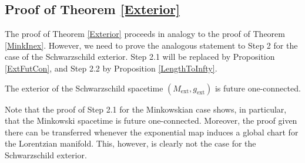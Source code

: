 \documentclass[reqno]{article}
\newcommand{\Mext}{M_{\mathrm{ext}}}
\newcommand{\gext}{g_{\mathrm{ext}}}
\begin{document}
\subsection{Proof of Theorem \ref{Exterior}}

The proof of Theorem \ref{Exterior} proceeds in analogy to the proof of Theorem \ref{MinkInex}. However, we need to prove the analogous statement to Step 2 for the case of the Schwarzschild exterior. Step 2.1 will be replaced by Proposition \ref{ExtFutCon}, and Step 2.2 by Proposition \ref{LengthToInfty}.

\begin{proposition}\label{schwprop:ExtFutCon}
\label{ExtFutCon}
The exterior of the Schwarzschild spacetime $(\Mext, \gext)$ is future one-connected.
\end{proposition}

Note that the proof of Step 2.1 for the Minkowskian case shows, in particular, that the Minkowski spacetime is future one-connected. Moreover, the proof given there can be transferred whenever the exponential map induces a global chart for the Lorentzian manifold. This, however, is clearly not the case for the Schwarzschild exterior. 
\end{document}

